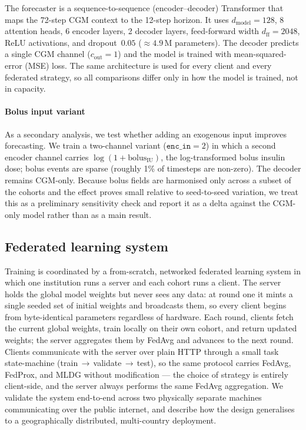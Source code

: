 \documentclass[10pt,letterpaper]{article}
\begin{document}
The forecaster is a sequence-to-sequence (encoder--decoder) Transformer that maps
the 72-step CGM context to the 12-step horizon. It uses
$d_{\text{model}}=128$, 8 attention heads, 6 encoder layers, 2 decoder layers,
feed-forward width $d_{\text{ff}}=2048$, ReLU activations, and dropout~$0.05$
($\approx 4.9$\,M parameters). The decoder predicts a single CGM channel
($c_{\text{out}}=1$) and the model is trained with mean-squared-error (MSE) loss.
The same architecture is used for every client and every federated strategy, so
all comparisons differ only in how the model is trained, not in capacity.

\paragraph{Bolus input variant}
As a secondary analysis, we test whether adding an exogenous input improves
forecasting. We train a two-channel variant ($\texttt{enc\_in}=2$) in which a
second encoder channel carries $\log(1+\mathrm{bolus}_{\mathrm{IU}})$, the
log-transformed bolus insulin dose; bolus events are sparse (roughly 1\% of
timesteps are non-zero). The decoder remains CGM-only. Because bolus fields are
harmonised only across a subset of the cohorts and the effect proves small
relative to seed-to-seed variation, we treat this as a preliminary sensitivity
check and report it as a delta against the CGM-only model rather than as a main
result.

\subsection*{Federated learning system}

Training is coordinated by a from-scratch, networked federated learning system
in which one institution runs a server and each cohort runs a client. The server
holds the global model weights but never sees any data: at round one it mints a
single seeded set of initial weights and broadcasts them, so every client begins
from byte-identical parameters regardless of hardware. Each round, clients fetch
the current global weights, train locally on their own cohort, and return updated
weights; the server aggregates them by FedAvg and advances to the next round.
Clients communicate with the server over plain HTTP through a small task
state-machine (train\,$\rightarrow$\,validate\,$\rightarrow$\,test), so the same
protocol carries FedAvg, FedProx, and MLDG without modification --- the choice of
strategy is entirely client-side, and the server always performs the same FedAvg
aggregation. We validate the system end-to-end across two physically separate
machines communicating over the public internet, and describe how the design
generalises to a geographically distributed, multi-country deployment.
\end{document}
